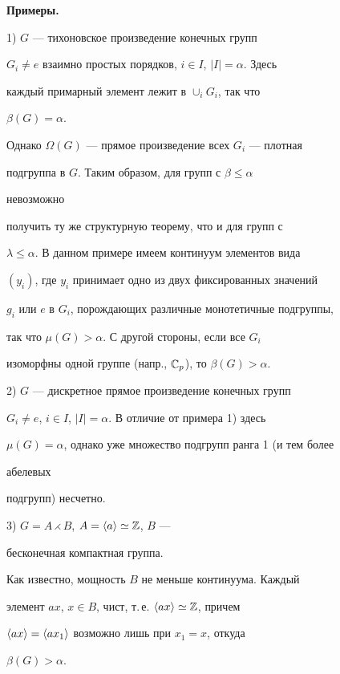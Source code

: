 \medskip 


 


{\bf Примеры.} 


1) $G$ --- тихоновское произведение конечных групп  


$G_i\ne e$ взаимно простых порядков, $i\in I$, $|I|=\alpha$. Здесь  


каждый примарный элемент лежит в $\cup_i G_i$, так что 


$\beta(G)=\alpha$. 


Однако $\Omega(G)$ --- прямое произведение всех $G_i$ --- плотная  


подгруппа в $G$. Таким образом, для групп с $\beta\le\alpha$ 


невозможно 


получить ту же структурную теорему, что и для групп с  


$\lambda\le\alpha$. В данном примере имеем континуум элементов вида  


$(y_i)$, где $y_i$ принимает одно из двух фиксированных значений  


$g_i$ или $e$ в $G_i$, порождающих различные монотетичные подгруппы, 


так что $\mu(G)>\alpha$. С другой стороны, если все $G_i$ 


изоморфны одной группе (напр., $\Bbb C_p$), то $\beta(G)>\alpha$. 


 


2) $G$ --- дискретное прямое произведение конечных групп 


$G_i\ne e$, $i\in I$, $|I|=\alpha$. В отличие от примера 1) здесь  


$\mu(G)=\alpha$, однако уже множество подгрупп ранга 1 (и тем более 


абелевых 


подгрупп) несчетно. 


 


3) $G=A\rightthreetimes B$, $A=\langle a\rangle\simeq\Bbb Z$, $B$ --- 


бесконечная компактная группа. 


Как известно, мощность $B$ не меньше континуума. Каждый 


элемент $ax$, $x\in B$, чист, т.\,е. $\langle ax\rangle\simeq\Bbb Z$, причем  


$\langle ax\rangle=\langle ax_1\rangle$ возможно лишь при $x_1=x$, откуда 


$\beta(G)>\alpha$. 


